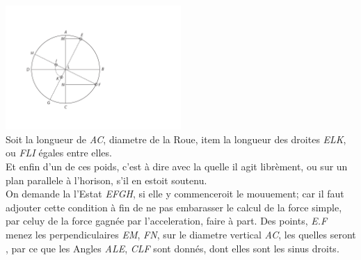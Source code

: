 \includegraphics[trim = 0mm 0mm 0mm 0mm, clip, width=0.5\textwidth]{images/lh0351009_001r-d1.pdf}\\
\noindent {}%
\pend
\newpage
\pstart
\indent Soit  la longueur de \textit{AC}, diametre\protect{} de la Roue, item la longueur des droites \textit{ELK}, ou \textit{FLI} \'{e}gales entre elles.\\
\indent Et enfin \protect{} d'un de ces poids, c'est \`{a} dire avec la quelle il agit libr\`{e}ment, ou sur un plan parallele \`{a} l'horison, s'il en 
estoit soutenu.\\
\indent On demande la  l'Estat \textit{EFGH}, si elle y commenceroit le mouuement\protect{}; car il faut adjouter cette condition \`{a} fin de ne pas embarasser le calcul de la force simple\protect{}, par celuy de la force gagn\'{e}e\protect{} 
par l'acceleration\protect{},  faire \`{a} part. 
\pend 
\pstart
Des points, \textit{E.F} menez les perpendiculaires \textit{EM}, \textit{FN}, sur le diametre\protect{} vertical \textit{AC}, les quelles seront , par ce que les Angles \textit{ALE}, \textit{CLF} sont donn\'{e}s, dont elles sont les 
sinus droits. 
